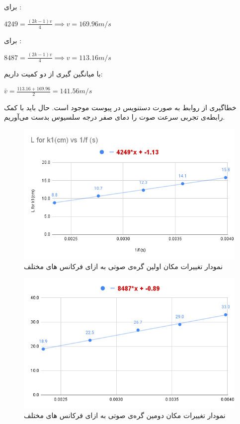 \documentclass{article}
\begin{document}
برای  : 
\begin{center}
$ 4249 = \frac{(2k-1)v}{4} \implies v = 169.96  m/s$
\end{center}
برای  : 
\begin{center}
$ 8487 = \frac{(2k-1)v}{4} \implies v = 113.16  m/s$
\end{center}
با میانگین گیری از دو کمیت داریم:
\begin{center}
$\bar{v} = \frac{113.16 + 169.96}{2} = 141.56  m/s$
\end{center}

خطاگیری از روابط به صورت دستنویس در پیوست موجود است.
حال باید با کمک رابطه‌ی تجربی  سرعت صوت را دمای صفر درجه سلسیوس بدست می‌آوریم.

\pagebreak


\begin{figure}[h!]
	\centering
	\includegraphics[scale=0.55]{L_K1.png}
	\caption{نمودار تغییرات مکان اولین گره‌ی صوتی به ازای فرکانس های مختلف}
	\label{first}
\end{figure}


\begin{figure}[h!]
	\centering
	\includegraphics[scale=0.55]{L_K2.png}
	\caption{نمودار تغییرات مکان دومین گره‌ی صوتی به ازای فرکانس های مختلف}
	\label{Seconde}
\end{figure}
\end{document}
